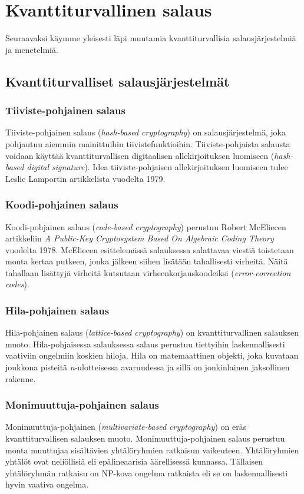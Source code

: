 \chapter{Kvanttiturvallinen salaus\label{results}}
Seuraavaksi käymme yleisesti läpi muutamia kvanttiturvallisia salausjärjestelmiä ja menetelmiä.

\section{Kvanttiturvalliset salausjärjestelmät}

\subsection{Tiiviste-pohjainen salaus}
Tiiviste-pohjainen salaus (\emph{hash-based cryptography}) on salausjärjestelmä, joka pohjautuu aiemmin mainittuihin tiivistefunktioihin. Tiiviste-pohjaista salausta voidaan käyttää kvanttiturvallisen digitaalisen allekirjoituksen luomiseen (\emph{hash-based digital signature}). Idea tiiviste-pohjaisen allekirjoituksen luomiseen tulee Leslie Lamportin artikkelista vuodelta 1979.

\subsection{Koodi-pohjainen salaus}
Koodi-pohjainen salaus (\emph{code-based cryptography}) perustuu Robert McEliecen artikkeliin \emph{A Public-Key Cryptosystem Based On Algebraic Coding Theory} vuodelta 1978. McEliecen esittelemässä salauksessa salattavaa viestiä toistetaan monta kertaa putkeen, jonka jälkeen siihen lisätään tahallisesti virheitä. Näitä tahallaan lisättyjä virheitä kutsutaan virheenkorjauskoodeiksi (\emph{error-correction codes}).

\subsection{Hila-pohjainen salaus}
Hila-pohjainen salaus (\emph{lattice-based cryptography}) on kvanttiturvallinen salauksen muoto. Hila-pohjaisessa salauksessa salaus perustuu tiettyihin laskennallisesti vaativiin ongelmiin koskien hiloja. Hila on matemaattinen objekti, joka kuvataan joukkona pisteitä \emph{n}-ulotteisessa avaruudessa ja sillä on jonkinlainen jaksollinen rakenne.

\subsection{Monimuuttuja-pohjainen salaus}
Monimuuttuja-pohjainen (\emph{multivariate-based cryptography}) on eräs kvanttiturvallisen salauksen muoto. Monimuuttuja-pohjainen salaus perustuu monta muuttujaa sisältävien yhtälöryhmien ratkaisun vaikeuteen. Yhtälöryhmien yhtälöt ovat neliöllisiä eli epälineaarisia äärellisessä kunnassa. Tällaisen yhtälöryhmän ratkaisu on NP-kova ongelma ratkaista eli se on laskennallisesti hyvin vaativa ongelma.